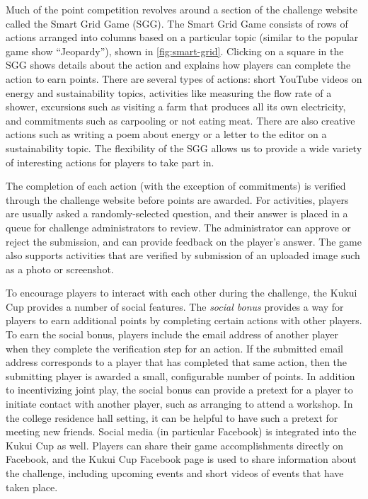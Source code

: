 \documentclass{sigchi}
\begin{document}
Much of the point competition revolves around a section of the challenge website called the Smart Grid Game (SGG). The Smart Grid Game consists of rows of actions arranged into columns based on a particular topic (similar to the popular game show ``Jeopardy''), shown in \autoref{fig:smart-grid}. Clicking on a square in the SGG shows details about the action and explains how players can complete the action to earn points. There are several types of actions: short YouTube videos on energy and sustainability topics, activities like measuring the flow rate of a shower, excursions such as visiting a farm that produces all its own electricity, and commitments such as carpooling or not eating meat. There are also creative actions such as writing a poem about energy or a letter to the editor on a sustainability topic. The flexibility of the SGG allows us to provide a wide variety of interesting actions for players to take part in.

The completion of each action (with the exception of commitments) is verified through the challenge website before points are awarded. For activities, players are usually asked a randomly-selected question, and their answer is placed in a queue for challenge administrators to review. The administrator can approve or reject the submission, and can provide feedback on the player's answer. The game also supports activities that are verified by submission of an uploaded image such as a photo or screenshot.

To encourage players to interact with each other during the challenge, the Kukui Cup provides a number of social features. The \emph{social bonus} provides a way for players to earn additional points by completing certain actions with other players. To earn the social bonus, players include the email address of another player when they complete the verification step for an action. If the submitted email address corresponds to a player that has completed that same action, then the submitting player is awarded a small, configurable number of points. In addition to incentivizing joint play, the social bonus can provide a pretext for a player to initiate contact with another player, such as arranging to attend a workshop. In the college residence hall setting, it can be helpful to have such a pretext for meeting new friends. Social media (in particular Facebook) is integrated into the Kukui Cup as well. Players can share their game accomplishments directly on Facebook, and the Kukui Cup Facebook page is used to share information about the challenge, including upcoming events and short videos of events that have taken place.
\end{document}
